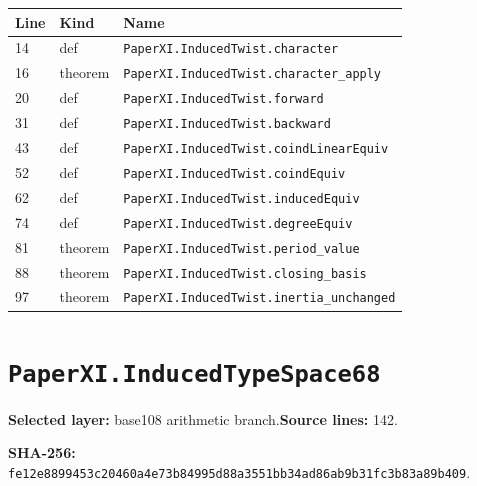 \documentclass[10pt,oneside]{book}
\begin{document}
\begin{longtable}{@{}p{}p{}p{}@{}}\toprule Line&Kind&Name\\\midrule\endhead

14&def&\nolinkurl{PaperXI.InducedTwist.character}\\

16&theorem&\nolinkurl{PaperXI.InducedTwist.character_apply}\\

20&def&\nolinkurl{PaperXI.InducedTwist.forward}\\

31&def&\nolinkurl{PaperXI.InducedTwist.backward}\\

43&def&\nolinkurl{PaperXI.InducedTwist.coindLinearEquiv}\\

52&def&\nolinkurl{PaperXI.InducedTwist.coindEquiv}\\

62&def&\nolinkurl{PaperXI.InducedTwist.inducedEquiv}\\

74&def&\nolinkurl{PaperXI.InducedTwist.degreeEquiv}\\

81&theorem&\nolinkurl{PaperXI.InducedTwist.period_value}\\

88&theorem&\nolinkurl{PaperXI.InducedTwist.closing_basis}\\

97&theorem&\nolinkurl{PaperXI.InducedTwist.inertia_unchanged}\\

\bottomrule\end{longtable}

\section{\texorpdfstring{\nolinkurl{PaperXI.InducedTypeSpace68}}{PaperXI.InducedTypeSpace68}}\label{module:PaperXI.InducedTypeSpace68}

\textbf{Selected layer:} base108 arithmetic branch.\quad\textbf{Source lines:} 142.\par\textbf{SHA-256:} {\scriptsize\nolinkurl{fe12e8899453c20460a4e73b84995d88a3551bb34ad86ab9b31fc3b83a89b409}}.

\end{document}
